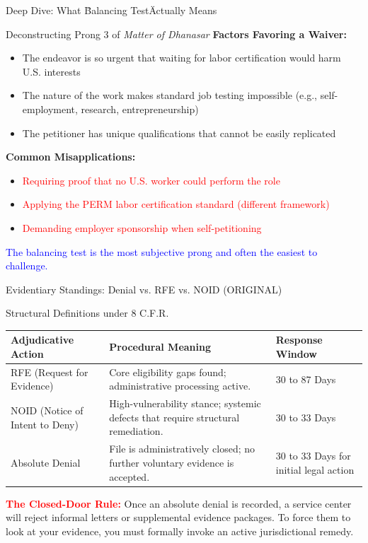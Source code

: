 \documentclass[11pt]{beamer}
\begin{document}
	\begin{frame}{Deep Dive: What \"Balancing Test\" Actually Means}
		\scriptsize
		\begin{block}{Deconstructing Prong 3 of \textit{Matter of Dhanasar}}
			\textbf{Factors Favoring a Waiver:}
			\begin{itemize}
				\item The endeavor is so urgent that waiting for labor certification would harm U.S. interests
				\item The nature of the work makes standard job testing impossible (e.g., self-employment, research, entrepreneurship)
				\item The petitioner has unique qualifications that cannot be easily replicated
			\end{itemize}
			\textbf{Common Misapplications:}
			\begin{itemize}
				\item \textcolor{red}{Requiring proof that no U.S. worker could perform the role}
				\item \textcolor{red}{Applying the PERM labor certification standard (different framework)}
				\item \textcolor{red}{Demanding employer sponsorship when self-petitioning}
			\end{itemize}
			\textcolor{blue}{The balancing test is the most subjective prong and often the easiest to challenge.}
		\end{block}
	\end{frame}
	
	
	\begin{frame}{Evidentiary Standings: Denial vs. RFE vs. NOID (ORIGINAL)}
		\scriptsize
		\begin{block}{Structural Definitions under 8 C.F.R.}
			\centering
			\begin{tabular}{|p{3cm}|p{5cm}|p{2.5cm}|}
				\hline
				\textbf{Adjudicative Action} & \textbf{Procedural Meaning} & \textbf{Response Window} \\
				\hline
				RFE (Request for Evidence) & Core eligibility gaps found; administrative processing active. & 30 to 87 Days \\
				\hline
				NOID (Notice of Intent to Deny) & High-vulnerability stance; systemic defects that require structural remediation. & 30 to 33 Days \\
				\hline
				Absolute Denial & File is administratively closed; no further voluntary evidence is accepted. & 30 to 33 Days for initial legal action \\
				\hline
			\end{tabular}
			\vspace{0.2cm}
			\flushleft \textcolor{red}{\textbf{The Closed-Door Rule:}} Once an absolute denial is recorded, a service center will reject informal letters or supplemental evidence packages. To force them to look at your evidence, you must formally invoke an active jurisdictional remedy.
		\end{block}
	\end{frame}
	
\end{document}
